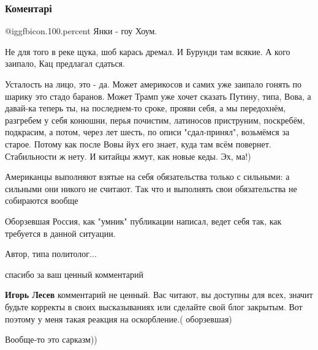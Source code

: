  
 
 
 
 
\subsubsection{Коментарі}
\label{sec:29_06_2018.fb.lesev_igor.1.vstrecha_v_helsinki.cmt}

\begin{itemize} %
@igg{fbicon.100.percent} Янки - гоу Хоум.


Не для того в реке щука, шоб карась дремал. И Бурунди там всякие. А кого
заипало, Кац предлагал сдаться.

Усталость на лицо, это - да. Может америкосов и самих уже заипало гонять по
шарику это стадо баранов. Может Трамп уже хочет сказать Путину, типа, Вова, а
давай-ка теперь ты, на последнем-то сроке, прояви себя, а мы передохнём,
разгребем у себя конюшни, перья почистим, латиносов приструним, поскребём,
подкрасим, а потом, через лет шесть, по описи "сдал-принял", возьмёмся за
старое. Потому как после Вовы йух его знает, куда там всём повернет.
Стабильности ж нету. И китайцы жмут, как новые кеды. Эх, ма!)


Американцы выполняют взятые на себя обязательства только с сильными: а сильными
они никого не считают. Так что и выполнять свои обязательства не собираются
вообще


Оборзевшая Россия, как "умник" публикации написал, ведет себя так, как
требуется в данной ситуации.

Автор, типа политолог...

\begin{itemize} %
спасибо за ваш ценный комментарий

\textbf{Игорь Лесев} комментарий не ценный. Вас читают, вы доступны для всех, значит будьте корректы в своих высказываниях или сделайте свой блог закрытым. Вот поэтому у меня такая реакция на оскорбление.( оборзевшая)

Вообще-то это сарказм))
\end{itemize} %

\end{itemize} %
